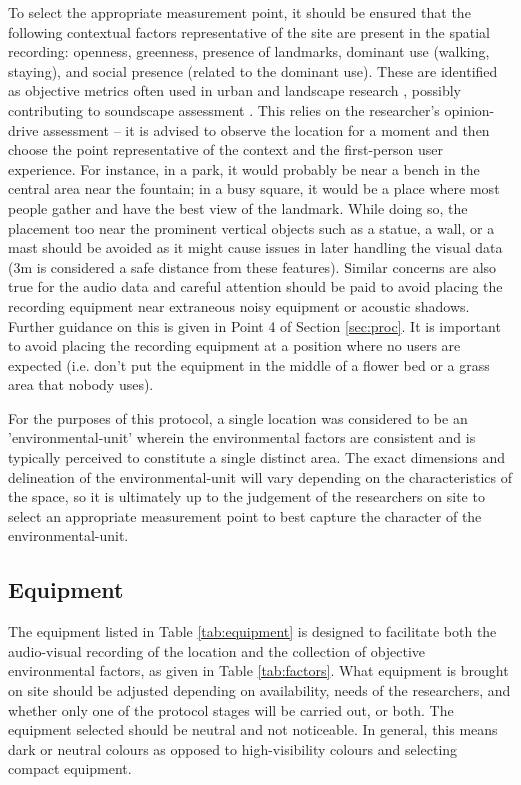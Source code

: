    To select the appropriate measurement point, it should be ensured that the following contextual factors representative of the site are present in the spatial recording: openness, greenness, presence of landmarks, dominant use (walking, staying), and social presence (related to the dominant use). These are identified as objective metrics often used in urban and landscape research , possibly contributing to soundscape assessment . This relies on the researcher's opinion-drive assessment -- it is advised to observe the location for a moment and then choose the point representative of the context and the first-person user experience. For instance, in a park, it would probably be near a bench in the central area near the fountain; in a busy square, it would be a place where most people gather and have the best view of the landmark. While doing so, the placement too near the prominent vertical objects such as a statue, a wall, or a mast should be avoided as it might cause issues in later handling the visual data (3m is considered a safe distance from these features). Similar concerns are also true for the audio data and careful attention should be paid to avoid placing the recording equipment near extraneous noisy equipment or acoustic shadows. Further guidance on this is given in Point 4 of Section \ref{sec:proc}. It is important to avoid placing the recording equipment at a position where no users are expected (i.e. don't put the equipment in the middle of a flower bed or a grass area that nobody uses).

   For the purposes of this protocol, a single location was considered to be an '\gls{environmental-unit}' wherein the environmental factors are consistent and is typically perceived to constitute a single distinct area. The exact dimensions and delineation of the \gls{environmental-unit} will vary depending on the characteristics of the space, so it is ultimately up to the judgement of the researchers on site to select an appropriate measurement point to best capture the character of the \gls{environmental-unit}.

 \subsection{Equipment}
   \label{sec:equipment}
   The equipment listed in Table \ref{tab:equipment} is designed to facilitate both the audio-visual recording of the location and the collection of objective environmental factors, as given in Table \ref{tab:factors}. What equipment is brought on site should be adjusted depending on availability, needs of the researchers, and whether only one of the protocol stages will be carried out, or both. The equipment selected should be neutral and not noticeable. In general, this means dark or neutral colours as opposed to high-visibility colours and selecting compact equipment.

